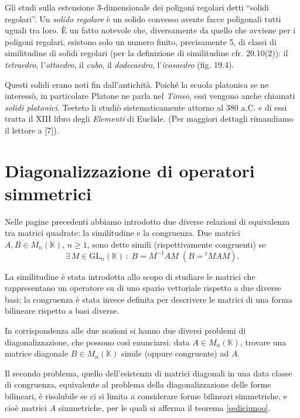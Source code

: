 \documentclass{article}
\theoremstyle{plain}
\theoremstyle{definition}
\theoremstyle{remark}
\begin{document}
Gli studi sulla estensione 3-dimensionale dei poligoni regolari detti ``solidi regolari''. Un 
\textit{solido regolare} è un solido convesso avente facce poligonali tutti uguali tra loro. È un fatto 
notevole che, diversamente da quello che avviene per i poligoni regolari, esistono solo un numero finito, 
precisamente 5, di classi di similitudine di solidi regolari (per la definizione di similitudine cfr. 
20.10(2)): il \textit{tetraedro}, l'\textit{ottaedro}, il \textit{cubo}, il \textit{dodecaedro}, 
l'\textit{icosaedro} (fig. 19.4).

Questi solidi erano noti fin dall'antichità. Poiché la scuola platonica se ne interessò, in particolare 
Platone ne parla nel \textit{Timeo}, essi vengono anche chiamati \textit{solidi platonici}. Teeteto li 
studiò sistematicamente attorno al 380 a.C. e di essi tratta il XIII libro degli \textit{Elementi} di 
Euclide. (Per maggiori dettagli rimandiamo il lettore a [7]).

\newpage
\section{Diagonalizzazione di operatori simmetrici}
\vspace{20pt}

Nelle pagine precedenti abbiamo introdotto due diverse relazioni di equivalenza tra matrici quadrate: 
la similitudine e la congruenza. Due matrici $A,B \in M_n(\mathbb{K})$, $n \geq 1$, sono dette simili
(rispettivamente congruenti) se 
\[\exists\,M \in \mathrm{GL}_n(\mathbb{K})\,:\;B = M^{-1}AM \;(B = {}^tMAM).\]

\vspace{10pt}

La similitudine è stata introdotta allo scopo di studiare le matrici che rappresentano un operatore su di 
uno spazio vettoriale rispetto a due diverse basi; la congruenza è stata invece definita per descrivere le 
matrici di una forma bilineare rispetto a basi diverse.

\vspace{10pt}

In corrispondenza alle due nozioni si hanno due diversi problemi di diagonalizzazione, che possono così 
enunciarsi: data $A \in M_n(\mathbb{K})$, trovare una matrice diagonale $B \in M_n(\mathbb{K})$ simile 
(oppure congruente) ad $A$.

\vspace{10pt}

Il secondo problema, quello dell'esistenza di matrici diagonali in una data classe di congruenza, 
equivalente al problema della diagonalizzazione delle forme bilineari, è risolubile se ci si limita a 
considerare forme bilineari simmetriche, e cioè matrici $A$ simmetriche, per le quali si afferma il 
teorema \ref{sediciunoo}.
\end{document}
